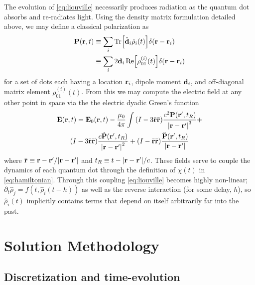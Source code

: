 \documentclass[conference]{IEEEtran}
\begin{document}
The evolution of \cref{eq:liouville} necessarily produces radiation as the quantum dot absorbs and re-radiates light.
Using the density matrix formulation detailed above, we may define a classical polarization as
\begin{equation}
  \begin{aligned}
    \vb{P}(\vb{r}, t) &\equiv \sum_i \Tr[\hat{\vb{d}}_i \hat{\rho}_i(t)] \delta(\vb{r} - \vb{r}_i) \\
                      &\equiv \sum_i 2 \vb{d}_i \Re\!\qty[\rho_{01}^{(i)}(t)] \delta(\vb{r} - \vb{r}_i)
  \end{aligned}
  \label{eq:polarization}
\end{equation}
for a set of dots each having a location $\vb{r}_i$, dipole moment $\vb{d}_i$, and off-diagonal matrix element $\rho_{01}^{(i)}(t)$.
From this we may compute the electric field at any other point in space via the the electric dyadic Green's function\cite{Rothwell2008}
\begin{equation}
  \begin{gathered}
    \vb{E}(\vb{r}, t) = \vb{E}_0(\vb{r}, t) - \frac{\mu_0}{4\pi} \int
      \qty(I - 3\bar{\vb{r}}\bar{\vb{r}}) \frac{c^2 \vb{P}(\vb{r}', t_R)}{\abs{\vb{r} - \vb{r}'}^3} + \\
      \qty(I - 3\bar{\vb{r}}\bar{\vb{r}}) \frac{c \dot{\vb{P}}(\vb{r}', t_R)}{\abs{\vb{r} - \vb{r}'}^2} +
      \qty(I -  \bar{\vb{r}}\bar{\vb{r}}) \frac{\ddot{\vb{P}}(\vb{r}', t_R)}{\abs{\vb{r} - \vb{r}'}}
  \end{gathered}
  \label{eq:efield}
\end{equation}
where $\bar{\vb{r}} \equiv \vb{r} - \vb{r}'/\abs{\vb{r} - \vb{r}'}$ and $t_R \equiv t - \abs{\vb{r} - \vb{r}'}/c$.
These fields serve to couple the dynamics of each quantum dot through the definition of $\chi(t)$ in \cref{eq:hamiltonian}.
Through this coupling \cref{eq:liouville} becomes highly non-linear; $\partial_t \hat{\rho}_j = f(t, \hat{\rho}_i(t - h))$ as well as the reverse interaction (for some delay, $h$), so $\hat{\rho}_i(t)$ implicitly contains terms that depend on itself arbitrarily far into the past.



\section{Solution Methodology}
\subsection{Discretization and time-evolution}
\end{document}

